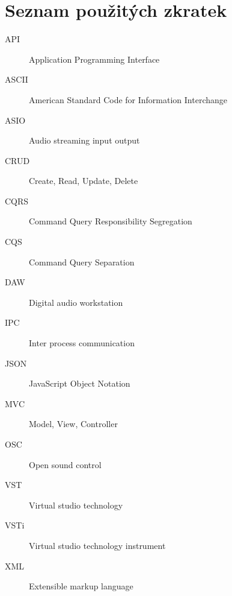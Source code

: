 \documentclass[thesis=M,czech]{FITthesis}[2019/03/06]
\begin{document}
\chapter{Seznam použitých zkratek}
\begin{description}
	\item[API] Application Programming Interface
	\item[ASCII] American Standard Code for Information Interchange
	\item[ASIO] Audio streaming input output
	\item[CRUD] Create, Read, Update, Delete
	\item[CQRS] Command Query Responsibility Segregation
	\item[CQS] Command Query Separation
	\item[DAW] Digital audio workstation
	\item[IPC] Inter process communication
	\item[JSON] JavaScript Object Notation
	\item[MVC] Model, View, Controller
	\item[OSC] Open sound control
	\item[VST] Virtual studio technology
	\item[VSTi] Virtual studio technology instrument
	\item[XML] Extensible markup language
\end{description}
\end{document}
